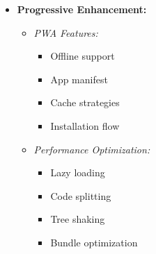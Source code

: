 \begin{itemize}
    \item \textbf{Progressive Enhancement:}
    \begin{itemize}
        \item \textit{PWA Features:}
        \begin{itemize}
            \item Offline support
            \item App manifest
            \item Cache strategies
            \item Installation flow
        \end{itemize}
        \item \textit{Performance Optimization:}
        \begin{itemize}
            \item Lazy loading
            \item Code splitting
            \item Tree shaking
            \item Bundle optimization
        \end{itemize}
    \end{itemize}
\end{itemize} 